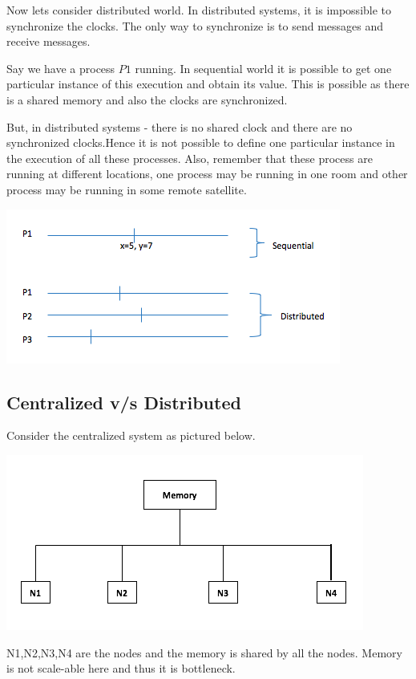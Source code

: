 \documentclass[twoside]{article}
\begin{document}
Now lets consider distributed world. In distributed systems, it is impossible to synchronize the clocks. The only way to synchronize is to send messages and receive messages.

Say we have a process $P1$ running. In sequential world it is possible to get one particular instance of this execution and obtain its value. This is possible as there is a shared memory and also the clocks are synchronized.


But, in distributed systems - there is no shared clock and there are no synchronized clocks.Hence it is not possible to define one particular instance in the execution of all these processes. Also, remember that these process are running at different locations, one process may be running in one room and other process may be running in some remote satellite.

\includegraphics[scale=0.7]{images/Global_state.png}

\subsection{Centralized v/s Distributed}

Consider the centralized system as pictured below.

\includegraphics[scale=0.7]{images/centralized.png}

N1,N2,N3,N4 are the nodes and the memory is shared by all the nodes. Memory is not scale-able here and thus it is bottleneck.
\end{document}
